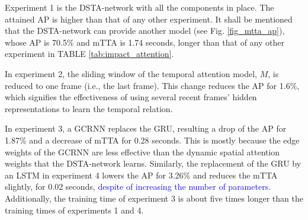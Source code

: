 \documentclass[journal]{IEEEtran}
\begin{document}
\begin{table}[ht!]
\renewcommand{\arraystretch}{1.3}
    \caption{Ablation study on the DAD dataset}
    \label{tab:impact_attention}
    \centering
\end{table}

Experiment 1 is the DSTA-network with all the components in place. The attained AP is higher than that of any other experiment. It shall be mentioned that the DSTA-network can provide another model (see Fig. \ref{fig_mtta_ap}), whose AP is 70.5\% and mTTA is 1.74 seconds, longer than that of any other experiment in TABLE \ref{tab:impact_attention}. 

In experiment 2, the sliding window of the temporal attention model, $M$, is reduced to one frame (i.e., the last frame). This change reduces the AP for 1.6\%, which signifies the effectiveness of using several recent frames' hidden representations to learn the temporal relation. 

In experiment 3, a GCRNN replaces the GRU, resulting a drop of the AP for 1.87\% and a decrease of mTTA for 0.28 seconds. This is mostly because the edge weights of the GCRNN are less effective than the dynamic spatial attention weights that the DSTA-network learns. Similarly, the replacement of the GRU by an LSTM in experiment 4 lowers the AP for 3.26\% and reduces the mTTA slightly, for 0.02 seconds, \textcolor{blue}{despite of increasing the number of parameters.} Additionally, the training time of experiment 3 is about five times longer than the training times of experiments 1 and 4.
\end{document}
